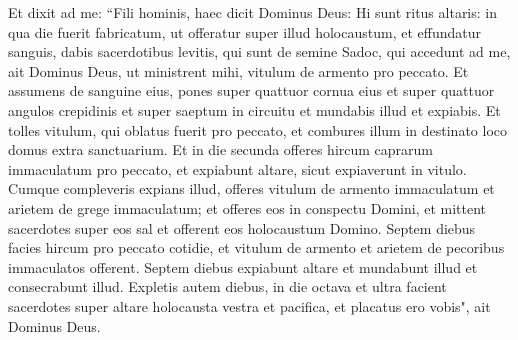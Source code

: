 \begin{biblechapter}
\verse Et dixit ad me: “Fili hominis, haec dicit Dominus Deus: Hi sunt ritus altaris: in qua die fuerit fabricatum, ut offeratur super illud holocaustum, et effundatur sanguis, 
\verse dabis sacerdotibus levitis, qui sunt de semine Sadoc, qui accedunt ad me, ait Dominus Deus, ut ministrent mihi, vitulum de armento pro peccato. 
\verse Et assumens de sanguine eius, pones super quattuor cornua eius et super quattuor angulos crepidinis et super saeptum in circuitu et mundabis illud et expiabis. 
\verse Et tolles vitulum, qui oblatus fuerit pro peccato, et combures illum in destinato loco domus extra sanctuarium. 
\verse Et in die secunda offeres hircum caprarum immaculatum pro peccato, et expiabunt altare, sicut expiaverunt in vitulo. 
\verse Cumque compleveris expians illud, offeres vitulum de armento immaculatum et arietem de grege immaculatum; 
\verse et offeres eos in conspectu Domini, et mittent sacerdotes super eos sal et offerent eos holocaustum Domino. 
\verse Septem diebus facies hircum pro peccato cotidie, et vitulum de armento et arietem de pecoribus immaculatos offerent. 
\verse Septem diebus expiabunt altare et mundabunt illud et consecrabunt illud. 
\verse Expletis autem diebus, in die octava et ultra facient sacerdotes super altare holocausta vestra et pacifica, et placatus ero vobis", ait Dominus Deus. 
\end{biblechapter}

